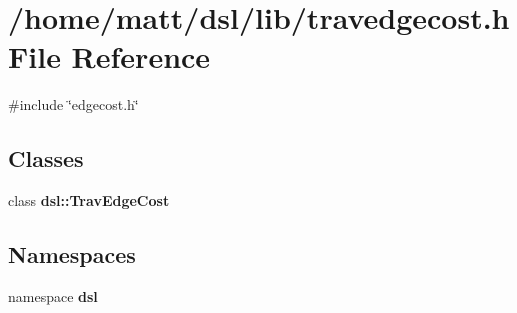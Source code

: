 \section{/home/matt/dsl/lib/travedgecost.h \-File \-Reference}
\label{travedgecost_8h}
{\ttfamily \#include \char`\"{}edgecost.\-h\char`\"{}}\*
\subsection*{\-Classes}
\begin{DoxyCompactItemize}
\item 
class {\bf dsl\-::\-Trav\-Edge\-Cost}
\end{DoxyCompactItemize}
\subsection*{\-Namespaces}
\begin{DoxyCompactItemize}
\item 
namespace {\bf dsl}
\end{DoxyCompactItemize}
